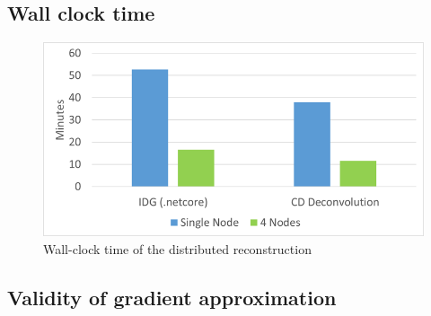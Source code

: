\subsection{Wall clock time}
\begin{figure}[h]
	\centering
	\includegraphics[width=0.80\linewidth]{./chapters/10.results/wall-clock-time.png}
	\caption{Wall-clock time of the distributed reconstruction}
	\label{results:time:fig}
\end{figure}


\subsection{Validity of gradient approximation} \label{results:gradients}